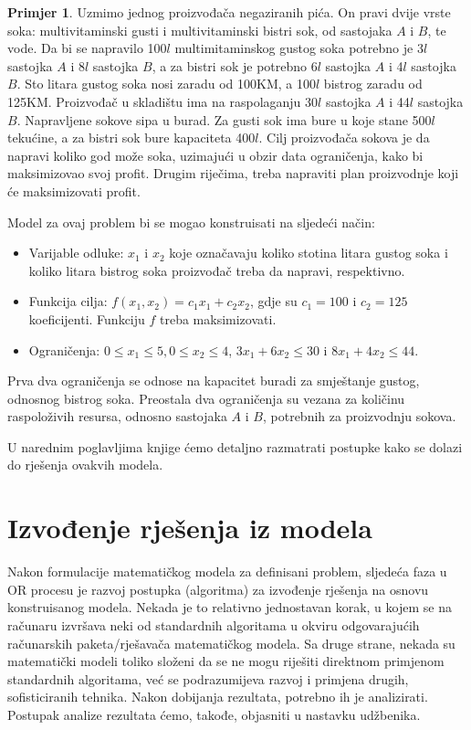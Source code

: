 \documentclass[a4paper, utf8, 11pt, colorlinks]{book}
\theoremstyle{definition}
\newtheorem{primjer}{Primjer}[chapter]
\begin{document}
\begin{primjer}
Uzmimo jednog proizvođača negaziranih pića. On pravi dvije vrste soka: multivitaminski gusti i multivitaminski bistri sok, od sastojaka $A$ i $B$, te vode. Da bi se napravilo 100$l$ multimitaminskog gustog soka potrebno je 3$l$
sastojka $A$ i 8$l$ sastojka $B$, a za bistri sok je potrebno 6$l$ sastojka $A$ i 4$l$ sastojka $B$. Sto litara gustog soka nosi zaradu od 100KM, a 100$l$ bistrog zaradu od 125KM. Proizvođač u skladištu
ima na raspolaganju 30$l$ sastojka $A$ i 44$l$ sastojka $B.$ Napravljene sokove sipa u burad. Za
gusti sok ima bure u koje stane 500$l$ tekućine, a za bistri sok bure kapaciteta 400$l$.  Cilj proizvođača sokova je da napravi koliko god
može soka, uzimajući u obzir data ograničenja, kako bi maksimizovao svoj profit. Drugim
riječima, treba napraviti plan proizvodnje koji će maksimizovati profit.
	
\end{primjer}
Model za ovaj problem bi se mogao konstruisati na sljedeći način:
\begin{itemize}
    \item 
Varijable odluke: $x_1$ i $x_2$ koje označavaju koliko stotina litara gustog soka i koliko litara bistrog soka proizvođač treba da napravi, respektivno.  
\item Funkcija cilja: $f(x_1, x_2) = c_1x_1 + c_2 x_2$, gdje su $c_1 = 100$ i  $c_2 = 125$ koeficijenti. Funkciju $f$ treba maksimizovati. 
\item Ograničenja: $0 \leq x_1 \leq 5, 0 \leq x_2 \leq 4$,   $3 x_1 + 6 x_2 \leq 30$ i $8 x_1 + 4 x_2 \leq 44.$
\end{itemize}
Prva dva ograničenja se odnose na kapacitet buradi za smještanje gustog, odnosnog bistrog soka. Preostala dva ograničenja su vezana za količinu raspoloživih resursa, odnosno sastojaka $A$ i $B$, potrebnih za proizvodnju sokova.

U narednim poglavljima knjige ćemo detaljno razmatrati postupke kako se dolazi do rješenja ovakvih modela.
 

\section{Izvođenje rješenja iz modela}

Nakon formulacije matematičkog modela za definisani problem, sljedeća faza u OR procesu  je razvoj postupka (algoritma) za
izvođenje rješenja na osnovu konstruisanog modela. Nekada je to relativno jednostavan korak, u kojem se na računaru izvršava neki od standardnih algoritama u okviru odgovarajućih računarskih paketa/rješavača matematičkog modela. Sa druge strane, nekada su matematički modeli toliko složeni da se ne mogu riješiti direktnom primjenom standardnih algoritama, već se podrazumijeva razvoj i primjena drugih, sofisticiranih tehnika.
Nakon dobijanja rezultata, potrebno ih je analizirati. Postupak analize rezultata ćemo, takođe, objasniti u nastavku udžbenika. 
\end{document}
